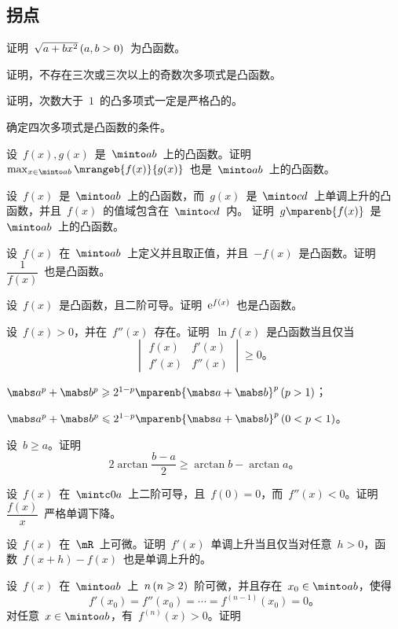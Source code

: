 \subsection{拐点}
\begin{exercise}
\item 证明~$\sqrt{a+bx^2}\mcond{a,b>0}$~为凸函数。
\item 证明，不存在三次或三次以上的奇数次多项式是凸函数。
\item 证明，次数大于~$1$~的凸多项式一定是严格凸的。
\item 确定四次多项式是凸函数的条件。
\item 设~$f(x),g(x)$~是~$\minto ab$~上的凸函数。证明~$\max_{x\in\minto ab}\mrangeb{f(x)}{g(x)}$~也是~$\minto ab$~上的凸函数。
\item 设~$f(x)$~是~$\minto ab$~上的凸函数，而~$g(x)$~是~$\minto cd$~上单调上升的凸函数，并且~$f(x)$~的值域包含在~$\minto cd$~内。%
证明~$g\mparenb{f(x)}$~是~$\minto ab$~上的凸函数。
\item 设~$f(x)$~在~$\minto ab$~上定义并且取正值，并且~$-f(x)$~是凸函数。证明~$\dfrac1{f(x)}$~也是凸函数。
\item 设~$f(x)$~是凸函数，且二阶可导。证明~$\mathrm e^{f(x)}$~也是凸函数。
\item 设~$f(x)>0$，并在~$f''(x)$~存在。证明~$\ln f(x)$~是凸函数当且仅当
\[
  \begin{vmatrix}
    f(x)  & f'(x) \\
    f'(x) & f''(x)
  \end{vmatrix}\geq0 。
\]
\item%
\begin{exlist}\FixExHead
  \item $\mabs a^p+\mabs b^p\geq 2^{1-p}\mparenb{\mabs a+\mabs b}^p\mcond{p>1}$；
  \item $\mabs a^p+\mabs b^p\leq 2^{1-p}\mparenb{\mabs a+\mabs b}^p\mcond{0<p<1}$。
\end{exlist}
\item 设~$b\geq a$。证明
\[
  2\arctan\dfrac{b-a}2\geq\arctan b-\arctan a 。
\]
\item 设~$f(x)$~在~$\mintc 0a$~上二阶可导，且~$f(0)=0$，而~$f''(x)<0$。证明~$\dfrac{f(x)}x$~严格单调下降。
\item 设~$f(x)$~在~$\mR$~上可微。证明~$f'(x)$~单调上升当且仅当对任意~$h>0$，函数~$f(x+h)-f(x)$~也是单调上升的。
\item 设~$f(x)$~在~$\minto ab$~上~$n\mcond{n\geq2}$~阶可微，并且存在~$x_0\in\minto ab$，使得
\[
  f'(x_0)=f''(x_0)=\dotsb=f^{(n-1)}(x_0)=0 。
\]
对任意~$x\in\minto ab$，有~$f^{(n)}(x)>0$。证明

\end{exercise}
